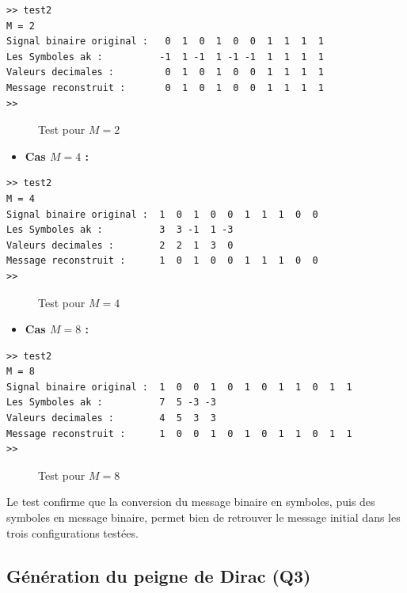 \documentclass[12pt,a4paper]{article}
\begin{document}
\begin{lstlisting}
>> test2
M = 2
Signal binaire original :   0  1  0  1  0  0  1  1  1  1
Les Symboles ak :          -1  1 -1  1 -1 -1  1  1  1  1
Valeurs decimales :         0  1  0  1  0  0  1  1  1  1
Message reconstruit :       0  1  0  1  0  0  1  1  1  1
>>
\end{lstlisting}

\begin{figure}[H]
    \centering
    \caption{Test pour $M = 2$}
    \label{fig:test_m2_q2}
\end{figure}

\begin{itemize}
    \item \textbf{Cas $M = 4$ :}
\end{itemize}

\begin{lstlisting}
>> test2
M = 4
Signal binaire original :  1  0  1  0  0  1  1  1  0  0
Les Symboles ak :          3  3 -1  1 -3
Valeurs decimales :        2  2  1  3  0
Message reconstruit :      1  0  1  0  0  1  1  1  0  0
>>
\end{lstlisting}

\begin{figure}[H]
    \centering
    \caption{Test pour $M = 4$}
    \label{fig:test_m4_q2}
\end{figure}

\begin{itemize}
    \item \textbf{Cas $M = 8$ :}
\end{itemize}

\begin{lstlisting}
>> test2
M = 8
Signal binaire original :  1  0  0  1  0  1  0  1  1  0  1  1
Les Symboles ak :          7  5 -3 -3
Valeurs decimales :        4  5  3  3
Message reconstruit :      1  0  0  1  0  1  0  1  1  0  1  1
>>
\end{lstlisting}

\begin{figure}[H]
    \centering
    \caption{Test pour $M = 8$}
    \label{fig:test_m8_q2}
\end{figure}

Le test confirme que la conversion du message binaire en symboles, puis des symboles en message binaire, permet bien de retrouver le message initial dans les trois configurations testées.

\newpage

\subsection{Génération du peigne de Dirac (Q3)}
\end{document}
